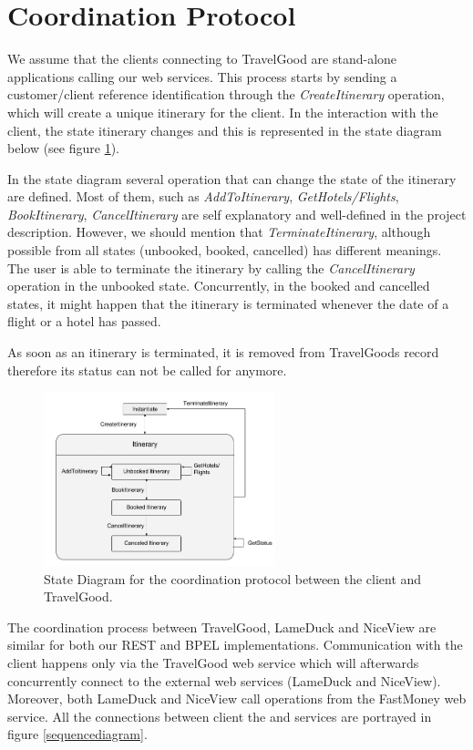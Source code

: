 \section{Coordination Protocol}

We assume that the clients connecting to TravelGood are stand-alone applications calling our web services. This process starts by sending a customer/client reference identification through the \textit{CreateItinerary} operation, which will create a unique itinerary for the client. In the interaction with the client, the state itinerary changes and this is represented in the state diagram below (see figure \ref{statediagram}).  

In the state diagram several operation that can change the state of the itinerary are defined. Most of them, such as \textit{AddToItinerary}, \textit{GetHotels/Flights}, \textit{BookItinerary}, \textit{CancelItinerary} are self explanatory and well-defined in the project description. However, we should mention that \textit{TerminateItinerary}, although possible from all states (unbooked, booked, cancelled) has different meanings. The user is able to terminate the itinerary by calling the \textit{CancelItinerary} operation in the unbooked state. Concurrently, in the booked and cancelled states, it might happen that the itinerary is terminated whenever the date of a flight or a hotel has passed. 

As soon as an itinerary is terminated, it is removed from TravelGoods record therefore its status can not be called for anymore. 


\begin{figure}[H]
\centering
\includegraphics[width=0.6\textwidth]{images/StateDiagram}
\caption{State Diagram for the coordination protocol between the client and TravelGood.}
\label{statediagram}
\end{figure}

The coordination process between TravelGood, LameDuck and NiceView are similar for both our REST and BPEL implementations. Communication with the client happens only via the TravelGood web service which will afterwards concurrently connect to the external web services (LameDuck and NiceView). Moreover, both LameDuck and NiceView call operations from the FastMoney web service. All the connections between client the and services are portrayed in figure \ref{sequencediagram}. 

